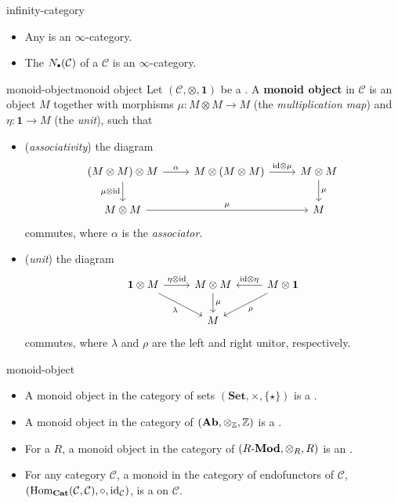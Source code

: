 \begin{example}{infinity-category}
    \begin{itemize}
        \item Any  is an $\infty$-category.
        \item The  $N_\bdot(\mathcal{C})$ of a  $\mathcal{C}$ is an $\infty$-category.
    \end{itemize}
\end{example}

\begin{topic}{monoid-object}{monoid object}
    Let $(\mathcal{C}, \otimes, \textbf{1})$ be a . A \textbf{monoid object} in $\mathcal{C}$ is an object $M$ together with morphisms $\mu : M \otimes M \to M$ (the \textit{multiplication map}) and $\eta : \textbf{1} \to M$ (the \textit{unit}), such that
    \begin{itemize}
        \item (\textit{associativity}) the diagram
        \[ \begin{tikzcd} (M \otimes M) \otimes M \arrow[swap]{d}{\mu \otimes \id} \arrow{r}{\alpha} & M \otimes (M \otimes M) \arrow{r}{\id \otimes \mu} & M \otimes M \arrow{d}{\mu} \\ M \otimes M \arrow{rr}{\mu} && M \end{tikzcd} \]
        commutes, where $\alpha$ is the \textit{associator}.
        \item (\textit{unit}) the diagram
        \[ \begin{tikzcd} \textbf{1} \otimes M \arrow{r}{\eta \otimes \id} \arrow[swap]{rd}{\lambda} & M \otimes M \arrow{d}{\mu} & M \otimes \textbf{1} \arrow[swap]{l}{\id \otimes \eta} \arrow{dl}{\rho} \\ & M & \end{tikzcd} \]
        commutes, where $\lambda$ and $\rho$ are the left and right unitor, respectively.
    \end{itemize}
\end{topic}

\begin{example}{monoid-object}
    \begin{itemize}
        \item A monoid object in the category of sets $(\textbf{Set}, \times, \{ \star \})$ is a .
        \item A monoid object in the category of  $(\textbf{Ab}, \otimes_{\mathbb{Z}}, \mathbb{Z})$ is a .
        \item For a  $R$, a monoid object in the category of  $(R\textup{-}\textbf{Mod}, \otimes_R, R)$ is an .
        \item For any category $\mathcal{C}$, a monoid in the category of endofunctors of $\mathcal{C}$, $(\text{Hom}_\textbf{Cat}(\mathcal{C}, \mathcal{C}), \circ, \text{id}_\mathcal{C})$, is a  on $\mathcal{C}$.
    \end{itemize}
\end{example}